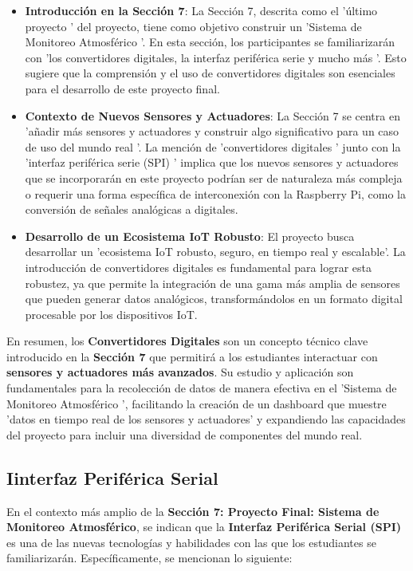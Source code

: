 \documentclass{report}
\begin{document}
\begin{itemize}
    \item \textbf{Introducción en la Sección 7}: La Sección 7, descrita como el  'último proyecto ' del proyecto, tiene como objetivo construir un  
    'Sistema de Monitoreo Atmosférico '. En esta sección, los participantes se familiarizarán con  'los convertidores digitales, la interfaz periférica 
    serie y mucho más '. Esto sugiere que la comprensión y el uso de convertidores digitales son esenciales para el desarrollo de este proyecto final.
    \item \textbf{Contexto de Nuevos Sensores y Actuadores}: La Sección 7 se centra en  'añadir más sensores y actuadores y construir algo significativo 
    para un caso de uso del mundo real '. La mención de  'convertidores digitales ' junto con la  'interfaz periférica serie (SPI) ' implica que los 
    nuevos sensores y actuadores que se incorporarán en este proyecto podrían ser de naturaleza más compleja o requerir una forma específica de 
    interconexión con la Raspberry Pi, como la conversión de señales analógicas a digitales.
    \item \textbf{Desarrollo de un Ecosistema IoT Robusto}: El proyecto busca desarrollar un  'ecosistema IoT robusto, seguro, en tiempo real y escalable'. 
    La introducción de convertidores digitales es fundamental para lograr esta robustez, ya que permite la integración de una gama más amplia de sensores 
    que pueden generar datos analógicos, transformándolos en un formato digital procesable por los dispositivos IoT.
\end{itemize}
En resumen, los \textbf{Convertidores Digitales} son un concepto técnico clave introducido en la \textbf{Sección 7} que permitirá a los estudiantes 
interactuar con \textbf{sensores y actuadores más avanzados}. Su estudio y aplicación son fundamentales para la recolección de datos de manera efectiva 
en el  'Sistema de Monitoreo Atmosférico ', facilitando la creación de un dashboard que muestre  'datos en tiempo real de los sensores y actuadores' 
y expandiendo las capacidades del proyecto para incluir una diversidad de componentes del mundo real.

\subsection{Iinterfaz Periférica Serial}
En el contexto más amplio de la \textbf{Sección 7: Proyecto Final: Sistema de Monitoreo Atmosférico}, se  indican que la 
\textbf{Interfaz Periférica Serial (SPI)} es una de las nuevas tecnologías y habilidades con las que los estudiantes se familiarizarán. 
Específicamente, se  mencionan lo siguiente:
\end{document}
